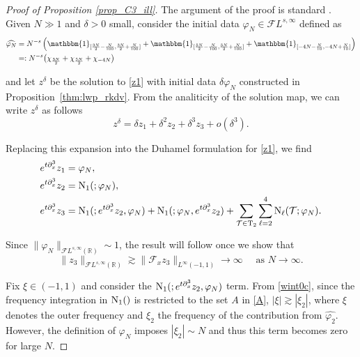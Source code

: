 \documentclass[%
11pt,  reqno]{amsart}
\makeatletter
\newcommand{\III}{\textup{I \hspace{-2.9mm} I \hspace{-2.9mm} I}}
\newcommand{\5}{\textup{V}}
\newcommand{\noi}{\noindent}
\newcommand{\ft}{\widehat}
\newcommand{\F}{\mathcal{F}}
\newcommand{\dx}{\partial_x}
\theoremstyle{remark}
\newcommand{\R}{\mathbb{R}}
\newcommand{\TT}{\mathcal{T}}
\newcommand{\Tr}{\mathrm{T}}
\newcommand{\gfrak}{\mathfrak{g}}
\renewcommand{\l}{\ell}
\def\<#1>{\csname MH@symb@#1\endcsname}
\numberwithin{equation}{section}
\numberwithin{theorem}{section}
\newcommand{\NN}{\mathrm{N}}
\makeatother
\begin{document}
\begin{proof}[Proof of Proposition \ref{prop_C3_ill}]
The argument of the proof is standard \cite{taobejenaru, bou_ill_kdv, MolTzeSaut_ill, Tzvetkov_ill}.
    Given $N\gg 1$ and $\delta>0$ small, consider the initial data $\varphi_N\in \mathcal{F}L^{s,\infty}$ defined as
\begin{align}
        \widehat{\varphi_N}&=N^{-s}\left(\mathbbm{1}_{[\frac{3N}{2}-\frac{N}{100}, \frac{3N}{2}+\frac{N}{100}]} + \mathbbm{1}_{[\frac{5N}{2}-\frac{N}{100}, \frac{5N}{2}+\frac{N}{100}]} + \mathbbm{1}_{[-4N-\frac{N}{10}, -4N+\frac{N}{10}]}\right)\\
        &=: N^{-s} \big(\chi_{\frac{3N}2}+ \chi_{\frac{5N}2} + \chi_{-4N} \big)
\end{align}

\noi
    and let $z^\delta$ be the solution to \eqref{z1} with initial data $\delta \varphi_N $ constructed in Proposition~\ref{thm:lwp_rkdv}. From the analiticity of the solution map, we can write $z^\delta$ as follows
    $$
    z^\delta = \delta z_1 + \delta^2z_2 + \delta^3 z_3 + o(\delta^3).
    $$

    \noi 
    Replacing this expansion into the Duhamel formulation for \eqref{z1}, we find 
    \begin{align}
        e^{t\dx^3} z_1 &= \varphi_N 
        , 
        \\
        e^{t\dx^3} z_2 &= \NN_1(\<1>;  \varphi_N ) 
        , 
        \\
        e^{t\dx^3} z_3 &= \NN_1(\<1>; e^{t\dx^3} {z}_2, {\varphi_N}) + \NN_1(\<1>;  {\varphi_N}, e^{t\dx^3}{z}_2)
         + \sum_{\TT\in \Tr_2}\sum_{\l=2}^4\NN_\l(\TT; {\varphi_N}) 
        .
        \label{eq:z3}
    \end{align}

    
    \noi
    Since $\|\varphi_N\|_{\F L^{s,\infty}(\R)}\sim 1$,
    the result will follow once we show that 
   $$
    \|z_3\|_{\F L^{s,\infty}(\R)} \gtrsim \|\F_xz_3\|_{ L^{\infty}(-1,1)}\to \infty \quad \mbox{ as }N\to \infty.
    $$


Fix $\xi\in(-1,1)$ and consider the $\NN_1(\<1>; e^{t\dx^3}{z}_2, {\varphi_N})$ term.
From \eqref{wint0c}, since the frequency integration in $\NN_1(\<1>)$ is restricted to the set $A$ in \eqref{A}, $|\xi|\gtrsim |\xi_2|$, where $\xi$ denotes the outer frequency and $\xi_2$ the frequency of the contribution from $\ft{\varphi_2}$. However, the definition of $\varphi_N$ imposes $|\xi_2|\sim N$ and thus this term becomes zero for large $N$. 


\end{proof}
\end{document}
